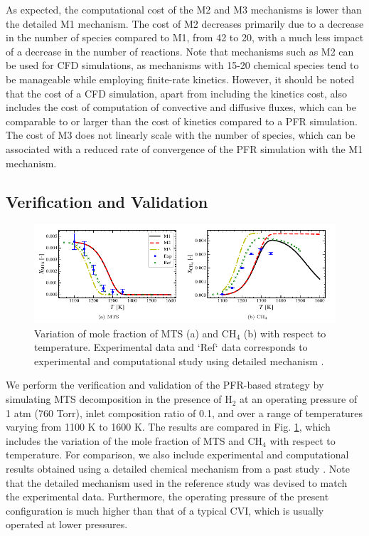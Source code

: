 \documentclass[final, letterpaper, square, comma, numbers, sort&compress]{elsarticle}
\begin{document}
As expected, the computational cost of the M2 and M3 mechanisms is lower than the detailed M1 mechanism. The cost of M2 decreases primarily due to a decrease in the number of species compared to M1, from 42 to 20, with a much less impact of a decrease in the number of reactions. Note that mechanisms such as M2 can be used for CFD simulations, as mechanisms with 15-20 chemical species tend to be manageable while employing finite-rate kinetics. However, it should be noted that the cost of a CFD simulation, apart from including the kinetics cost, also includes the cost of computation of convective and diffusive fluxes, which can be comparable to or larger than the cost of kinetics compared to a PFR simulation. The cost of M3 does not linearly scale with the number of species, which can be associated with a reduced rate of convergence of the PFR simulation with the M1 mechanism.

\subsection{Verification and Validation}
\begin{figure}[t] %
    \centering\includegraphics[width=\textwidth]{ph-fig5.png}
    \caption{Variation of mole fraction of MTS (a) and CH$_4$ (b) with respect to temperature. Experimental data and ‘Ref‘ data corresponds to experimental and computational study using detailed mechanism \cite{Dang2022}.}
    \label{fig:5}
\end{figure}

We perform the verification and validation of the PFR-based strategy by simulating MTS decomposition in the presence of H$_2$ at an operating pressure of 1 atm (760 Torr), inlet composition ratio of 0.1, and over a range of temperatures varying from 1100 K to 1600 K. The results are compared in Fig. \ref{fig:5}, which includes the variation of the mole fraction of MTS and CH$_4$ with respect to temperature. For comparison, we also include experimental and computational results obtained using a detailed chemical mechanism from a past study \cite{Dang2022}. Note that the detailed mechanism used in the reference study was devised to match the experimental data. Furthermore, the operating pressure of the present configuration is much higher than that of a typical CVI, which is usually operated at lower pressures. 
\end{document}
